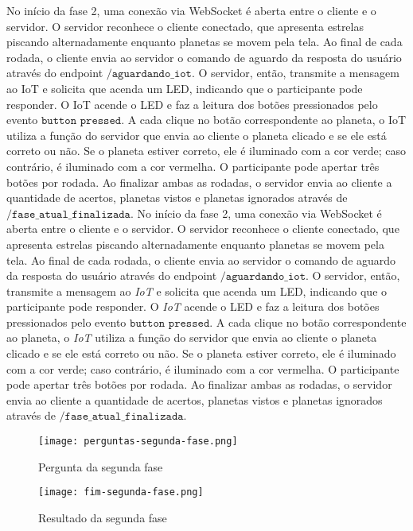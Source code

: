 No início da fase 2, uma conexão via WebSocket é aberta entre o cliente e o servidor. O servidor reconhece o cliente conectado, que apresenta estrelas piscando alternadamente enquanto planetas se movem pela tela. Ao final de cada rodada, o cliente envia ao servidor o comando de aguardo da resposta do usuário através do endpoint $\texttt{/aguardando\_iot}$. O servidor, então, transmite a mensagem ao IoT e solicita que acenda um LED, indicando que o participante pode responder. O IoT acende o LED e faz a leitura dos botões pressionados pelo evento $\texttt{button pressed}$. A cada clique no botão correspondente ao planeta, o IoT utiliza a função do servidor que envia ao cliente o planeta clicado e se ele está correto ou não. Se o planeta estiver correto, ele é iluminado com a cor verde; caso contrário, é iluminado com a cor vermelha. O participante pode apertar três botões por rodada. Ao finalizar ambas as rodadas, o servidor envia ao cliente a quantidade de acertos, planetas vistos e planetas ignorados através de $\texttt{/fase\_atual\_finalizada}$.
 No início da fase 2, uma conexão via WebSocket é aberta entre o cliente e o servidor. O servidor reconhece o cliente conectado, que apresenta estrelas piscando alternadamente enquanto planetas se movem pela tela. Ao final de cada rodada, o cliente envia ao servidor o comando de aguardo da resposta do usuário através do endpoint $\texttt{/aguardando\_iot}$. O servidor, então, transmite a mensagem ao \textit{IoT} e solicita que acenda um LED, indicando que o participante pode responder. O \textit{IoT} acende o LED e faz a leitura dos botões pressionados pelo evento $\texttt{button pressed}$. A cada clique no botão correspondente ao planeta, o \textit{IoT} utiliza a função do servidor que envia ao cliente o planeta clicado e se ele está correto ou não. Se o planeta estiver correto, ele é iluminado com a cor verde; caso contrário, é iluminado com a cor vermelha. O participante pode apertar três botões por rodada. Ao finalizar ambas as rodadas, o servidor envia ao cliente a quantidade de acertos, planetas vistos e planetas ignorados através de $\texttt{/fase\_atual\_finalizada}$.

\begin{figure}[H]
    \centering
    \caption{Pergunta da segunda fase}%
    \label{fig:perguntas-segunda-fase}
    \texttt{[image: perguntas-segunda-fase.png]}%
\end{figure}

\begin{figure}[H]
    \centering
    \caption{Resultado da segunda fase}%
    \label{fig:fim-segunda-fase}
    \texttt{[image: fim-segunda-fase.png]}%
\end{figure}

